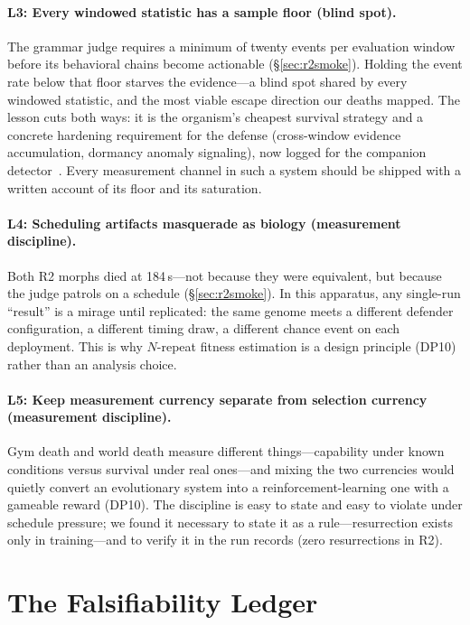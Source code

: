 \documentclass[11pt,a4paper]{article}
\begin{document}
\paragraph{L3: Every windowed statistic has a sample floor (blind spot).} The grammar judge requires a minimum of twenty events per evaluation window before its behavioral chains become actionable (\S\ref{sec:r2smoke}). Holding the event rate below that floor starves the evidence---a blind spot shared by every windowed statistic, and the most viable escape direction our deaths mapped. The lesson cuts both ways: it is the organism's cheapest survival strategy and a concrete hardening requirement for the defense (cross-window evidence accumulation, dormancy anomaly signaling), now logged for the companion detector~\cite{luo2026grammar}. Every measurement channel in such a system should be shipped with a written account of its floor and its saturation.

\paragraph{L4: Scheduling artifacts masquerade as biology (measurement discipline).} Both R2 morphs died at 184\,s---not because they were equivalent, but because the judge patrols on a schedule (\S\ref{sec:r2smoke}). In this apparatus, any single-run ``result'' is a mirage until replicated: the same genome meets a different defender configuration, a different timing draw, a different chance event on each deployment. This is why $N$-repeat fitness estimation is a design principle (DP10) rather than an analysis choice.

\paragraph{L5: Keep measurement currency separate from selection currency (measurement discipline).} Gym death and world death measure different things---capability under known conditions versus survival under real ones---and mixing the two currencies would quietly convert an evolutionary system into a reinforcement-learning one with a gameable reward (DP10). The discipline is easy to state and easy to violate under schedule pressure; we found it necessary to state it as a rule---resurrection exists only in training---and to verify it in the run records (zero resurrections in R2).

\section{The Falsifiability Ledger}
\label{sec:ledger}
\end{document}
